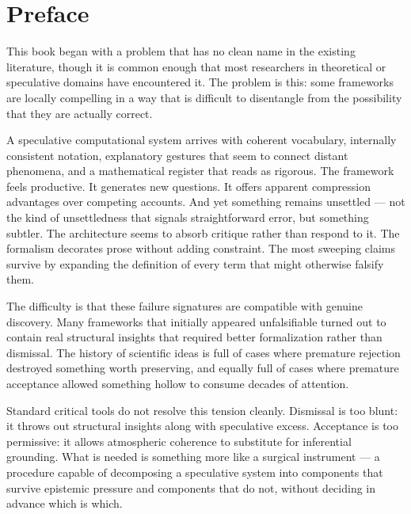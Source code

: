 
\chapter*{Preface}


\noindent
This book began with a problem that has no clean name in the existing
literature, though it is common enough that most researchers in
theoretical or speculative domains have encountered it. The problem
is this: some frameworks are locally compelling in a way that is
difficult to disentangle from the possibility that they are actually
correct.

A speculative computational system arrives with coherent vocabulary,
internally consistent notation, explanatory gestures that seem to
connect distant phenomena, and a mathematical register that reads as
rigorous. The framework feels productive. It generates new questions.
It offers apparent compression advantages over competing accounts. And
yet something remains unsettled --- not the kind of unsettledness that
signals straightforward error, but something subtler. The architecture
seems to absorb critique rather than respond to it. The formalism
decorates prose without adding constraint. The most sweeping claims
survive by expanding the definition of every term that might otherwise
falsify them.

The difficulty is that these failure signatures are compatible with
genuine discovery. Many frameworks that initially appeared unfalsifiable
turned out to contain real structural insights that required better
formalization rather than dismissal. The history of scientific ideas
is full of cases where premature rejection destroyed something worth
preserving, and equally full of cases where premature acceptance
allowed something hollow to consume decades of attention.

Standard critical tools do not resolve this tension cleanly. Dismissal
is too blunt: it throws out structural insights along with speculative
excess. Acceptance is too permissive: it allows atmospheric coherence
to substitute for inferential grounding. What is needed is something
more like a surgical instrument --- a procedure capable of decomposing
a speculative system into components that survive epistemic pressure
and components that do not, without deciding in advance which is which.

